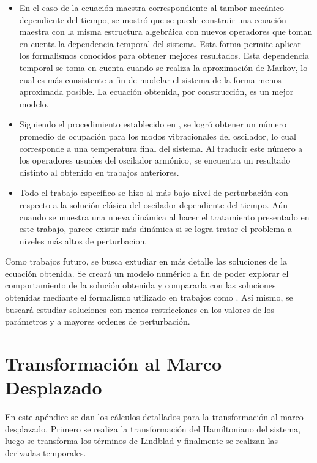\documentclass[a4paper,10pt]{report}
\begin{document}
\begin{itemize}
\item En el caso de la ecuación maestra correspondiente al tambor mecánico dependiente del tiempo, se mostró que se puede construir una ecuación maestra con la misma estructura algebráica con nuevos operadores que toman en cuenta la dependencia temporal del sistema. Esta forma permite aplicar los formalismos conocidos para obtener mejores resultados. Esta dependencia temporal se toma en cuenta cuando se realiza la aproximación de Markov, lo cual es más consistente a fin de modelar el sistema de la forma menos aproximada posible. La ecuación obtenida, por construcción, es un mejor modelo.

\item Siguiendo el procedimiento establecido en \cite{BarberisLC}, se logró obtener un número promedio de ocupación para los modos vibracionales del oscilador, lo cual corresponde a una temperatura final del sistema. Al traducir este número a los operadores usuales del oscilador armónico, se encuentra un resultado distinto al obtenido en trabajos anteriores.

\item Todo el trabajo específico se hizo al más bajo nivel de perturbación con respecto a la solución clásica del oscilador dependiente del tiempo. Aún cuando se muestra una nueva dinámica al hacer el tratamiento presentado en este trabajo, parece existir más dinámica si se logra tratar el problema a niveles más altos de perturbacion.
\end{itemize}

Como trabajos futuro, se busca extudiar en más detalle las soluciones de la ecuación obtenida. Se creará un modelo numérico a fin de poder explorar el comportamiento de la solución obtenida y compararla con las soluciones obtenidas mediante el formalismo utilizado en trabajos como \cite{BarberisLC}. Así mismo, se buscará estudiar soluciones con menos restricciones en los valores de los parámetros y a mayores ordenes de perturbación.

\appendix

\chapter{Transformación al Marco Desplazado}

En este apéndice se dan los cálculos detallados para la transformación al marco desplazado. Primero se realiza la transformación del Hamiltoniano del sistema, luego se transforma los términos de Lindblad y finalmente se realizan las derivadas temporales.
\end{document}
